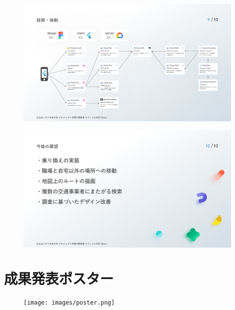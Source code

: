 \begin{figure}[htbp]
    \includegraphics[width=14cm]{images/slide9.png}
    \label{fig:slide9}
\end{figure}
\begin{figure}[htbp]
    \includegraphics[width=14cm]{images/slide10.png}
    \label{fig:slide10}
\end{figure}

\section{成果発表ポスター}
\begin{figure}[htbp]
    \centering
    \texttt{[image: images/poster.png]}
\end{figure}
